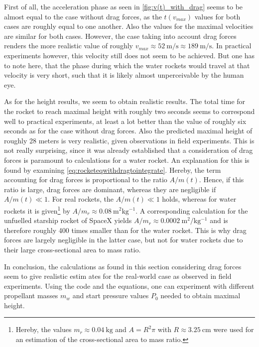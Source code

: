 \documentclass[a4paper,11pt]{report}
\begin{document}
First of all, the acceleration phase as seen in \cref{fig:v(t)_with_drag} seems to be almost equal to the case without drag forces, as the $t(v_{max})$ values for both cases are roughly equal to one another. Also the values for the maximal velocities are similar for both cases. However, the case taking into account drag forces renders the more realistic value of roughly $v_{max} \approx \SI{52}{\meter\per\second} \approx \SI{189}{\meter\per\second}$. In practical experiments however, this velocity still does not seem to be achieved. But one has to note here, that the phase during which the water rockets would travel at that velocity is very short, such that it is likely almost unperceivable by the human eye.

As for the height results, we seem to obtain realistic results. The total time for the rocket to reach maximal height with roughly two seconds seems to correspond well to practical experiments, at least a lot better than the value of roughly six seconds as for the case without drag forces. Also the predicted maximal height of roughly 28 meters is very realistic, given observations in field experiments. This is not really surprising, since it was already established that a consideration of drag forces is paramount to calculations for a water rocket. An explanation for this is found by examining \cref{eq:rocketeqwithdragtointegrate}. Hereby, the term accounting for drag forces is proportional to the ratio $A/m(t)$. Hence, if this ratio is large, drag forces are dominant, whereas they are negligible if $A/m(t) \ll 1$. For real rockets, the $A/m(t) \ll 1$ holds, whereas for water rockets it is given\footnote{Hereby, the values $m_r \approx \SI{0.04}{\kilogram}$ and $A = R^2\pi$ with $R \approx \SI{3.25}{\centi\meter}$ were used for an estimation of the cross-sectional area to mass ratio.} by $A/m_r \approx \SI{0.08}{\meter^2\kilogram^{-1}}$. A corresponding calculation for the unfuelled starship rocket of SpaceX yields $A/m_r \approx \SI{0.0002}{\meter^2/\kilogram^{-1}}$ and is therefore roughly 400 times smaller than for the water rocket. This is why drag forces are largely negligible in the latter case, but not for water rockets due to their large cross-sectional area to mass ratio.

In conclusion, the calculations as found in this section considering drag forces seem to give realistic estim
ates for the real-world case as observed in field experiments. Using the code and the equations, one can experiment with different propellant masses $m_w$ and start pressure values $P_0$ needed to obtain maximal height.
\end{document}
